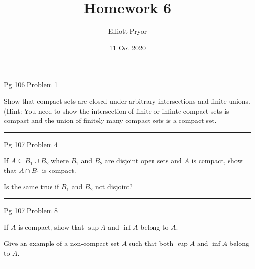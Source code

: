 \documentclass[11pt]{article}
\title{Homework 6}
\author{Elliott Pryor}
\date{11 Oct 2020}
\begin{document}
\maketitle

 Pg 106 Problem 1

Show that compact sets are closed under arbitrary intersections and finite unions. 
(Hint: You need to show the intersection of finite or infinte compact sets is compact and the union of finitely many compact sets is a compact set.

\hrule


\newpage
{} Pg 107 Problem 4

If $A \subseteq B_1 \cup B_2$ where $B_1$ and $B_2$ are disjoint open sets and $A$ is compact, show that $A \cap B_1$ is compact. 

Is the same true if $B_1$ and $B_2$ not disjoint?

\hrule

\newpage
{} Pg 107 Problem 8

If $A$ is compact, show that $\sup A$ and $\inf A$ belong to $A$. 

Give an example of a non-compact set $A$ such that both $\sup A$ and $\inf A$ belong to $A$.

\hrule
\end{document}
